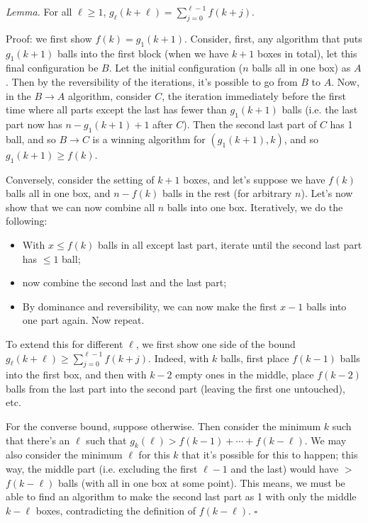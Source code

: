 \documentclass[11pt,a4paper]{article}
\begin{document}
	    \emph{Lemma.} For all $\ell\ge 1$, $g_{\ell}(k+\ell) = \sum_{j=0}^{\ell-1}f(k+j)$. 
	    
	    Proof: we first show $f(k)=g_{1}(k+1)$. 
	    Consider, first, any algorithm that puts $g_1(k+1)$ balls into the first block (when we have $k+1$ boxes in total), 
	    let this final configuration be $B$. 
	    Let the initial configuration ($n$ balls all in one box) as $A$. 
	    Then by the reversibility of the iterations, it's possible to go from $B$ to $A$. 
	    Now, in the $B\to A$ algorithm, consider $C$, the iteration immediately before the first time where all parts except the last has fewer than $g_1(k+1)$ balls 
	    (i.e. the last part now has $n-g_1(k+1)+1$ after $C$). 
	    Then the second last part of $C$ has 1 ball, 
	    and so $B\to C$ is a winning algorithm for $(g_1(k+1), k)$, and so $g_1(k+1)\ge f(k)$. 
	    
	    Conversely, consider the setting of $k+1$ boxes, and let's suppose we have $f(k)$ balls all in one box, and $n-f(k)$ balls in the rest (for arbitrary $n$). 
	    Let's now show that we can now combine all $n$ balls into one box. 
	    Iteratively, we do the following: 
	    \begin{itemize}
	    	\item With $x\le f(k)$ balls in all except last part, iterate until the second last part has $\le 1$ ball; 
	    	
	    	\item now combine the second last and the last part; 
	    	
	    	\item By dominance and reversibility, we can now make the first $x-1$ balls into one part again. Now repeat. 
	    \end{itemize}
        
        To extend this for different $\ell$, 
        we first show one side of the bound $g_{\ell}(k+\ell)\ge \sum_{j=0}^{\ell-1} f(k+j)$. 
        Indeed, with $k$ balls, 
        first place $f(k-1)$ balls into the first box, 
        and then with $k-2$ empty ones in the middle, 
        place $f(k-2)$ balls from the last part into the second part (leaving the first one untouched), 
        etc. 
        
        For the converse bound, suppose otherwise. 
        Then consider the minimum $k$ such that there's an $\ell$ such that 
        $g_{k}(\ell) > f(k-1)+\cdots + f(k-\ell)$. 
        We may also consider the minimum $\ell$ for this $k$ that it's possible for this to happen; 
        this way, the middle part (i.e. excluding the first $\ell-1$ and the last) would have $>$ 
        $f(k-\ell)$ balls (with all in one box at some point). 
        This means, we must be able to find an algorithm to make the second last part as 1 with only the middle $k-\ell$ boxes, contradicting the definition of $f(k-\ell)$. $\square$
        
\end{document}
